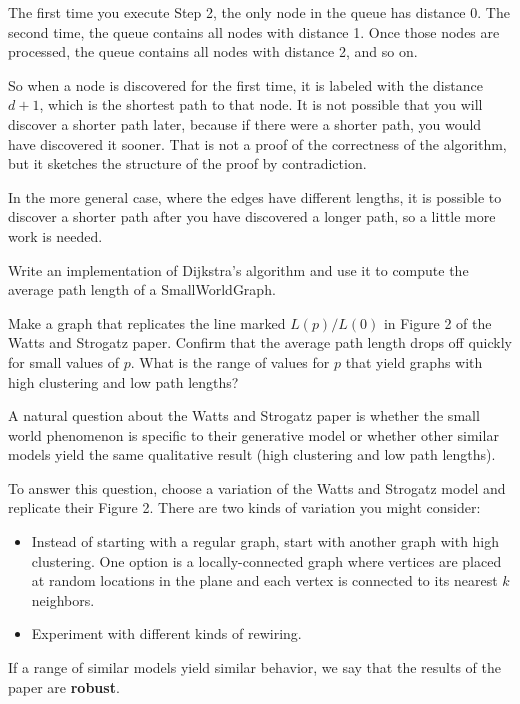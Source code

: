 \documentclass[10pt]{book}
\begin{document}
The first time you execute Step 2, the only node in the queue
has distance 0.  The second time, the queue contains all
nodes with distance 1.  Once those nodes are processed, the
queue contains all nodes with distance 2, and so on.

So when a node is discovered for the first time, it is labeled
with the distance $d+1$, which is the shortest path to that
node.  It is not possible that you will discover a shorter
path later, because if there were a shorter path, you would
have discovered it sooner.  That is not a proof
of the correctness of the algorithm, but it sketches
the structure of the proof by contradiction.

In the more general case, where the edges have different lengths,
it is possible to discover a shorter path after you have
discovered a longer path, so a little more work is needed.

\begin{exercise}

Write an implementation of Dijkstra's algorithm and use it
to compute the average path length of a SmallWorldGraph.

Make a graph that replicates the line marked $L(p)/L(0)$ in
Figure 2 of the Watts and Strogatz paper.  Confirm that the
average path length drops off quickly for
small values of $p$.  What is the range of values for $p$
that yield graphs with high clustering and low path lengths?

\end{exercise}


\begin{exercise}

A natural question about the Watts and Strogatz paper is
whether the small world phenomenon is specific to their
generative model or whether other similar models yield
the same qualitative result (high clustering and low path lengths).

To answer this question, choose a variation of the
Watts and Strogatz model and replicate their Figure 2.
There are two kinds of variation you might consider:

\begin{itemize}

\item Instead of starting with a regular graph, start with
another graph with high clustering.  One option is a locally-connected
graph where vertices are placed at random locations in the plane
and each vertex is connected to its nearest $k$ neighbors.

\item Experiment with different kinds of rewiring.

\end{itemize}

If a range of similar models yield similar behavior, we
say that the results of the paper are {\bf robust}.

\end{exercise}
\end{document}

